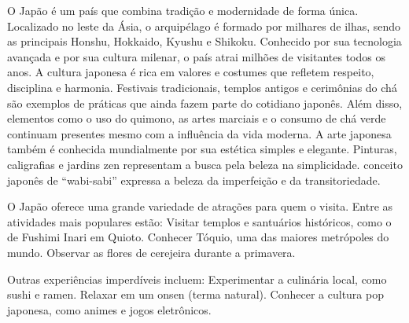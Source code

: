 \documentclass{article}
\begin{document}
O Japão é um país que combina tradição e modernidade de forma única. Localizado no leste da Ásia, o arquipélago é formado por milhares de ilhas, sendo as principais Honshu, Hokkaido, Kyushu e Shikoku.
Conhecido por sua tecnologia avançada e por sua cultura milenar, o país atrai milhões de visitantes todos os anos.
A cultura japonesa é rica em valores e costumes que refletem respeito, disciplina e harmonia.
Festivais tradicionais, templos antigos e cerimônias do chá são exemplos de práticas que ainda fazem parte do cotidiano japonês.
Além disso, elementos como o uso do quimono, as artes marciais e o consumo de chá verde continuam presentes mesmo com a influência da vida moderna.
A arte japonesa também é conhecida mundialmente por sua estética simples e elegante. Pinturas, caligrafias e jardins zen representam a busca pela beleza na simplicidade. conceito japonês de “wabi-sabi” expressa a beleza da imperfeição e da transitoriedade.

O Japão oferece uma grande variedade de atrações para quem o visita.
Entre as atividades mais populares estão:
    Visitar templos e santuários históricos, como o de Fushimi Inari em Quioto.
    Conhecer Tóquio, uma das maiores metrópoles do mundo.
    Observar as flores de cerejeira durante a primavera.

Outras experiências imperdíveis incluem:
    Experimentar a culinária local, como sushi e ramen.
    Relaxar em um onsen (terma natural).
    Conhecer a cultura pop japonesa, como animes e jogos eletrônicos.
\end{document}
